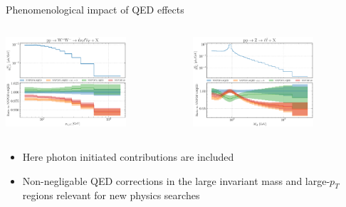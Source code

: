 \documentclass[aspectratio=169, 8pt,t]{beamer}
\begin{document}
\begin{frame}{Phenomenological impact of QED effects}
  \begin{columns}[T]
    \begin{column}{0.49\textwidth}
      \includegraphics[width=0.7\textwidth]{figures/NNPDF_WPWM_14TEV_40_PHENO-internal.pdf}
    \end{column}
    \begin{column}{0.49\textwidth}
      \vspace*{-3.5em}
      \includegraphics[width=0.7\textwidth]{figures/NNPDF_DY_14TEV_40_PHENO-internal.pdf}
    \end{column}
  \end{columns}
  \begin{columns}[T]
    \begin{column}{0.49\textwidth}
      \vspace*{1em}
      \begin{itemize}
        \item Here photon initiated contributions are included
        \item Non-negligable QED corrections in the large invariant mass and large-$p_T$ regions relevant for new physics searches

\end{itemize}
\end{column}
\end{columns}
\end{frame}
\end{document}
